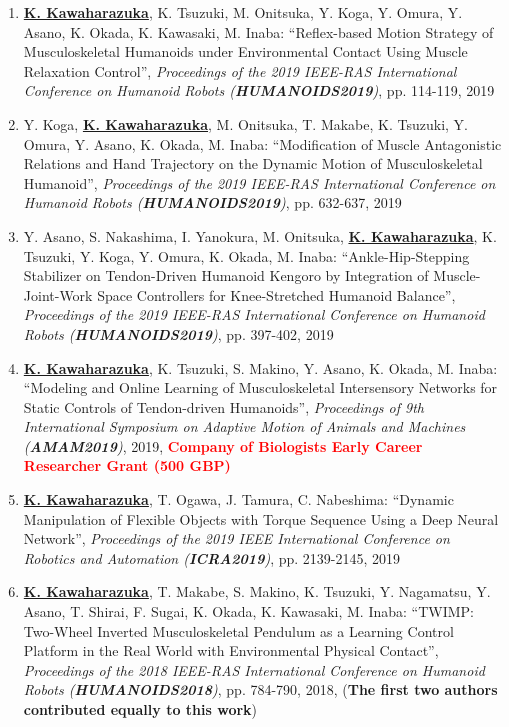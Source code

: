 \documentclass[letterpaper]{article}
\begin{document}
\begin{enumerate}
\item \underline{\textbf{K. Kawaharazuka}}, K. Tsuzuki, M. Onitsuka, Y. Koga, Y. Omura, Y. Asano, K. Okada, K. Kawasaki, M. Inaba: ``Reflex-based Motion Strategy of Musculoskeletal Humanoids under Environmental Contact Using Muscle Relaxation Control'', \textit{Proceedings of the 2019 IEEE-RAS International Conference on Humanoid Robots (\textit{\textbf{HUMANOIDS2019}})}, pp. 114-119, 2019
\item Y. Koga, \underline{\textbf{K. Kawaharazuka}}, M. Onitsuka, T. Makabe, K. Tsuzuki, Y. Omura, Y. Asano, K. Okada, M. Inaba: ``Modification of Muscle Antagonistic Relations and Hand Trajectory on the Dynamic Motion of Musculoskeletal Humanoid'', \textit{Proceedings of the 2019 IEEE-RAS International Conference on Humanoid Robots (\textit{\textbf{HUMANOIDS2019}})}, pp. 632-637, 2019
\item Y. Asano, S. Nakashima, I. Yanokura, M. Onitsuka, \underline{\textbf{K. Kawaharazuka}}, K. Tsuzuki, Y. Koga, Y. Omura, K. Okada, M. Inaba: ``Ankle-Hip-Stepping Stabilizer on Tendon-Driven Humanoid Kengoro by Integration of Muscle-Joint-Work Space Controllers for Knee-Stretched Humanoid Balance'', \textit{Proceedings of the 2019 IEEE-RAS International Conference on Humanoid Robots (\textit{\textbf{HUMANOIDS2019}})}, pp. 397-402, 2019
\item \underline{\textbf{K. Kawaharazuka}}, K. Tsuzuki, S. Makino, Y. Asano, K. Okada, M. Inaba: ``Modeling and Online Learning of Musculoskeletal Intersensory Networks for Static Controls of Tendon-driven Humanoids'', \textit{Proceedings of 9th International Symposium on Adaptive Motion of Animals and Machines (\textit{\textbf{AMAM2019}})}, 2019, \textbf{\textcolor{red}{Company of Biologists Early Career Researcher Grant (500 GBP)}}
\item \underline{\textbf{K. Kawaharazuka}}, T. Ogawa, J. Tamura, C. Nabeshima: ``Dynamic Manipulation of Flexible Objects with Torque Sequence Using a Deep Neural Network'', \textit{Proceedings of the 2019 IEEE International Conference on Robotics and Automation (\textit{\textbf{ICRA2019}})}, pp. 2139-2145, 2019
\item \underline{\textbf{K. Kawaharazuka}}, T. Makabe, S. Makino, K. Tsuzuki, Y. Nagamatsu, Y. Asano, T. Shirai, F. Sugai, K. Okada, K. Kawasaki, M. Inaba: ``TWIMP: Two-Wheel Inverted Musculoskeletal Pendulum as a Learning Control Platform in the Real World with Environmental Physical Contact'', \textit{Proceedings of the 2018 IEEE-RAS International Conference on Humanoid Robots (\textit{\textbf{HUMANOIDS2018}})}, pp. 784-790, 2018, (\textbf{The first two authors contributed equally to this work})

\end{enumerate}
\end{document}
